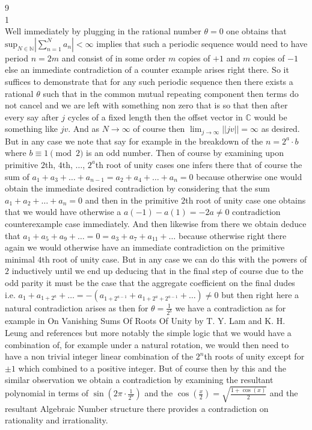 9 \\
1 \\
Well immediately by plugging in the rational number $\theta = 0$ one obtains that $\text{sup}_{N \in \mathbb{N}} \left| \sum_{n=1}^N a_n \right| < \infty$ implies that such a periodic sequence would need to have period $n = 2 m$ and consist of in some order $m$ copies of $+1$ and $m$ copies of $-1$ else an immediate contradiction of a counter example arises right there. So it suffices to demonstrate that for any such periodic sequence then there exists a rational $\theta$ such that in the common mutual repeating component then terms do not cancel and we are left with something non zero that is so that then after every say after $j$ cycles of a fixed length then the offset vector in $\mathbb{C}$ would be something like $jv$. And as $N \to \infty$ of course then $\lim_{j \to \infty} ||jv|| = \infty$ as desired. But in any case we note that say for example in the breakdown of the $n = 2^a \cdot b$ where $b \equiv 1 \pmod{2}$ is an odd number. Then of course by examining upon primitive $2$th, $4$th, $\dots$, $2^a$th root of unity cases one infers there that of course the sum of $a_1+a_3+\dots+a_{n-1} = a_2+a_4+\dots+a_n = 0$ because otherwise one would obtain the immediate desired contradiction by considering that the sum $a_1+a_2+\dots+a_n = 0$ and then in the primitive $2$th root of unity case one obtains that we would have otherwise a $a(-1)-a(1)=-2a \neq 0$ contradiction counterexample case immediately. And then likewise from there we obtain deduce that $a_1+a_5+a_9+\dots = 0 = a_3+a_7+a_{11}+\dots$ because otherwise right there again we would otherwise have an immediate contradiction on the primitive minimal $4$th root of unity case. But in any case we can do this with the powers of $2$ inductively until we end up deducing that in the final step of course due to the odd parity it must be the case that the aggregate coefficient on the final dudes i.e. $a_1+a_{1+2^a}+\dots = -(a_{1+2^{a-1}}+a_{1+2^a+2^{a-1}}+\dots) \neq 0$ but then right here a natural contradiction arises as then for $\theta = \frac{1}{2^b}$ we have a contradiction as for example in On Vanishing Sums Of Roots Of Unity by T. Y. Lam and K. H. Leung and references but more notably the simple logic that we would have a combination of, for example under a natural rotation, we would then need to have a non trivial integer linear combination of the $2^n$th roots of unity except for $\pm 1$ which combined to a positive integer. But of course then by this and the similar observation we obtain a contradiction by examining the resultant polynomial in terms of $\sin \left( 2 \pi \cdot \frac{1}{2^a} \right)$ and the $\cos \left( \frac{x}{2} \right) = \sqrt{ \frac{1+\cos(x)}{2} }$ and the resultant Algebraic Number structure there provides a contradiction on rationality and irrationality.

